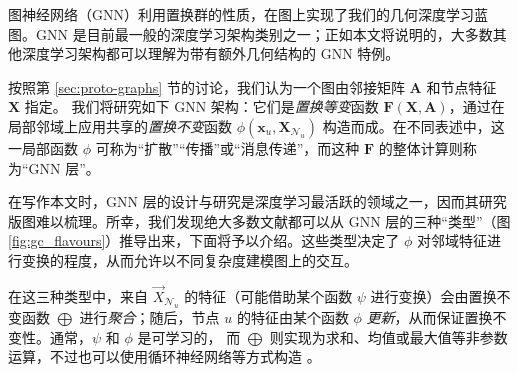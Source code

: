 %





图神经网络（GNN）利用置换群的性质，在图上实现了我们的几何深度学习蓝图。GNN 是目前最一般的深度学习架构类别之一；正如本文将说明的，大多数其他深度学习架构都可以理解为带有额外几何结构的 GNN 特例。


按照第 \ref{sec:proto-graphs} 节的讨论，我们认为一个图由邻接矩阵 $\mathbf{A}$ 和节点特征 $\mathbf{X}$ 指定。
%
%
我们将研究如下 GNN 架构：它们是{\em 置换等变}函数 $\mathbf{F}(\mathbf{X},\mathbf{A})$，通过在局部邻域上应用共享的{\em 置换不变}函数 $\phi(\mathbf{x}_u, \mathbf{X}_{\mathcal{N}_u})$ 构造而成。在不同表述中，这一局部函数 $\phi$ 可称为“扩散”“传播”或“消息传递”，而这种 $\mathbf{F}$ 的整体计算则称为“GNN 层”。


在写作本文时，GNN 层的设计与研究是深度学习最活跃的领域之一，因而其研究版图难以梳理。所幸，我们发现绝大多数文献都可以从 GNN 层的三种“类型”（图 \ref{fig:gc_flavours}）推导出来，下面将予以介绍。这些类型决定了 $\phi$ 对邻域特征进行变换的程度，从而允许以不同复杂度建模图上的交互。


在这三种类型中，来自 $\vec{X}_{\mathcal{N}_u}$ 的特征（可能借助某个函数 $\psi$ 进行变换）会由置换不变函数 $\bigoplus$ 进行\emph{聚合}；随后，节点 $u$ 的特征由某个函数 $\phi$ {\em 更新}，从而保证置换不变性。通常，$\psi$ 和 $\phi$ 是可学习的，
%
而 $\bigoplus$ 则实现为求和、均值或最大值等非参数运算，不过也可以使用循环神经网络等方式构造 \citep{murphy2018janossy}。


